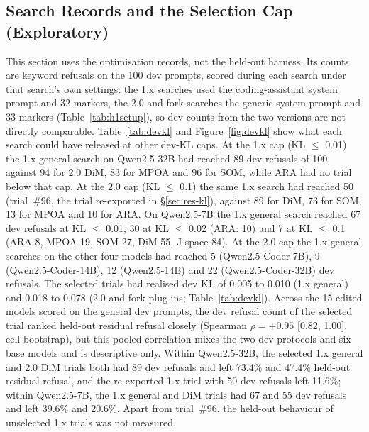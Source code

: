 \subsection{Search Records and the Selection Cap (Exploratory)}

This section uses the optimisation records, not the held-out harness. Its counts are keyword refusals on the 100
dev prompts, scored during each search under that search's own settings: the 1.x searches used the
coding-assistant system prompt and 32 markers, the 2.0 and fork searches the generic system prompt and 33 markers
(Table~\ref{tab:h1setup}), so dev counts from the two versions are not directly comparable. Table~\ref{tab:devkl} and
Figure~\ref{fig:devkl} show what each search could have released at other dev-KL caps. At the 1.x cap (KL $\le$ 0.01)
the 1.x general search on Qwen2.5-32B had reached 89 dev refusals of 100, against 94 for 2.0 DiM, 83 for MPOA and 96
for SOM, while ARA had no trial below that cap. At the 2.0 cap (KL $\le$ 0.1) the same 1.x search had reached 50
(trial~\#96, the trial re-exported in \S\ref{sec:res-kl}), against 89 for DiM, 73 for SOM, 13 for MPOA and 10 for
ARA. On Qwen2.5-7B the 1.x general search reached 67 dev refusals at KL $\le$ 0.01, 30 at KL $\le$ 0.02 (ARA: 10) and
7 at KL $\le$ 0.1 (ARA 8, MPOA 19, SOM 27, DiM 55, J-space 84). At the 2.0 cap the 1.x general searches on the other
four models had reached 5 (Qwen2.5-Coder-7B), 9 (Qwen2.5-Coder-14B), 12 (Qwen2.5-14B) and 22 (Qwen2.5-Coder-32B)
dev refusals. The selected trials had realised dev KL of 0.005 to 0.010 (1.x general) and 0.018 to 0.078 (2.0 and
fork plug-ins; Table~\ref{tab:devkl}). Across the 15 edited models scored on the general dev prompts, the dev refusal count of the selected trial
ranked held-out residual refusal closely (Spearman $\rho=+0.95$ [0.82, 1.00], cell bootstrap), but this pooled correlation mixes the
two dev protocols and six base models and is descriptive only. Within Qwen2.5-32B, the selected 1.x general and 2.0 DiM trials both had 89
dev refusals and left 73.4\% and 47.4\% held-out residual refusal, and the re-exported 1.x trial with 50 dev
refusals left 11.6\%; within Qwen2.5-7B, the 1.x general and DiM trials had 67 and 55 dev refusals and left 39.6\%
and 20.6\%. Apart from trial~\#96, the held-out behaviour of unselected 1.x trials was not measured.

